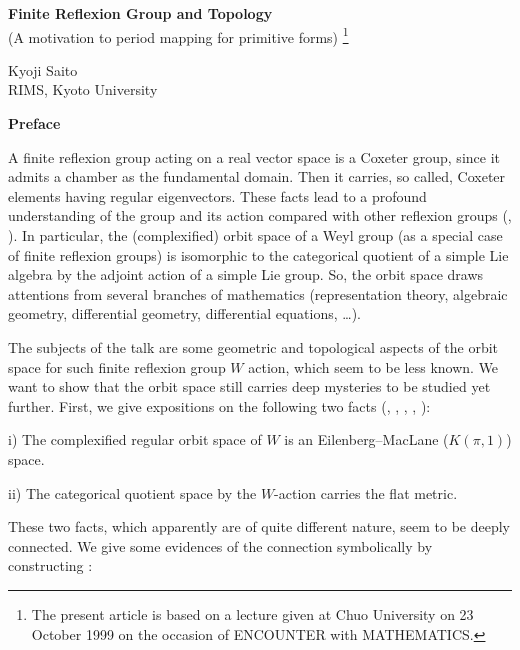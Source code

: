 \documentclass[uplatex,dvipdfmx]{jlreq}
\begin{document}
\newpage

\begin{center}
  {\large\bfseries Finite Reflexion Group and Topology}\\[4pt]
  {\normalsize (A motivation to period mapping for primitive forms)%
    \footnote{The present article is based on a lecture given at
    Chuo University on 23 October 1999 on the occasion of
    ENCOUNTER with MATHEMATICS.}}
\end{center}
\begin{flushright}
  {\large Kyoji Saito}\\
  RIMS, Kyoto University
\end{flushright}

\medskip
\begin{center}
  \textbf{Preface}
\end{center}

A finite reflexion group acting on a real vector space
is a Coxeter group,
since it admits a chamber as the fundamental domain.
Then it carries, so called, Coxeter elements having regular eigenvectors.
These facts lead to a profound understanding of the
group and its action compared with other reflexion groups (\cite{B}, \cite{Hu}).
In particular, the (complexified) orbit space of a Weyl group
(as a special case of finite reflexion groups) is
isomorphic to the categorical quotient of a simple Lie algebra by the
adjoint action of a simple Lie group.
So, the orbit space draws attentions from several
branches of mathematics (representation theory, algebraic geometry,
differential geometry, differential equations, \ldots).

The subjects of the talk are some geometric and topological aspects
of the orbit space for such finite reflexion group $W$ action,
which seem to be less known.
We want to show
that the orbit space still carries deep mysteries to be studied yet further.
First, we give expositions on the following two facts
(\cite{Br1, Br2}, \cite{D1}, \cite{B-S}, \cite{S1}, \cite{S-Y-S}):

\medskip
\noindent
i) The complexified regular orbit space of $W$ is an
Eilenberg--MacLane ($K(\pi,1)$) space.

\medskip
\noindent
ii) The categorical quotient space by the $W$-action carries the flat metric.

\medskip
\noindent
These two facts, which apparently are of quite different nature,
seem to be deeply connected.
We give some evidences of the connection symbolically by constructing \cite{S5}:
\end{document}
